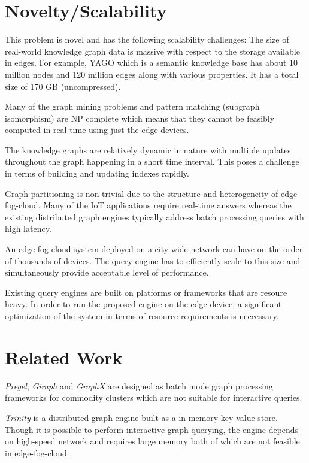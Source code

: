 \documentclass[conference]{IEEEtran}
\begin{document}
\section{Novelty/Scalability}
This problem is novel and has the following scalability challenges: The size of real-world knowledge graph data is massive with respect to the storage available in edges. For example, YAGO which is a semantic knowledge base has about 10 million nodes and 120 million edges along with various properties. It has a total size of 170 GB (uncompressed).

Many of the graph mining problems and pattern matching (subgraph isomorphism) are NP complete which means that they cannot be feasibly computed in real time using just the edge devices. 

The knowledge graphs are relatively dynamic in nature with multiple updates throughout the graph happening in a short time interval. This poses a challenge in terms of building and updating indexes rapidly.

Graph partitioning is non-trivial due to the structure and heterogeneity of edge-fog-cloud. Many of the IoT applications require real-time answers whereas the existing distributed graph engines typically address batch processing queries with high latency.

An edge-fog-cloud system deployed on a city-wide network can have on the order of thousands of devices.  The query engine has to efficiently scale to this size and simultaneously provide acceptable level of performance.

Existing query engines are built on platforms or frameworks that are resoure heavy. In order to run the proposed engine on the edge device, a significant optimization of the system in terms of resource requirements is neccessary. 

\section{Related Work}

\emph{Pregel}, \emph{Giraph} and \emph{GraphX} are designed as batch mode graph processing frameworks for commodity clusters which are not suitable for interactive queries.

\emph{Trinity} is a distributed graph engine built as a in-memory key-value store. Though it is possible to perform interactive graph querying, the engine depends on high-speed network and requires large memory both of which are not feasible in edge-fog-cloud.
\end{document}
